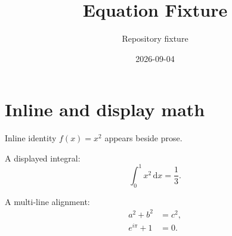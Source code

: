 \documentclass[11pt,a4paper]{article}
\title{Equation Fixture}
\author{Repository fixture}
\date{2026-09-04}%
\begin{document}
\maketitle

\section{Inline and display math}
Inline identity \(f(x) = x^{2}\) appears beside prose.

A displayed integral:
\[
  \int_{0}^{1} x^{2}\,\mathrm{d}x = \frac{1}{3}.
\]

A multi-line alignment:
\begin{align}
  a^{2} + b^{2} & = c^{2}, \\
  e^{i\pi} + 1  & = 0.
\end{align}
\end{document}
